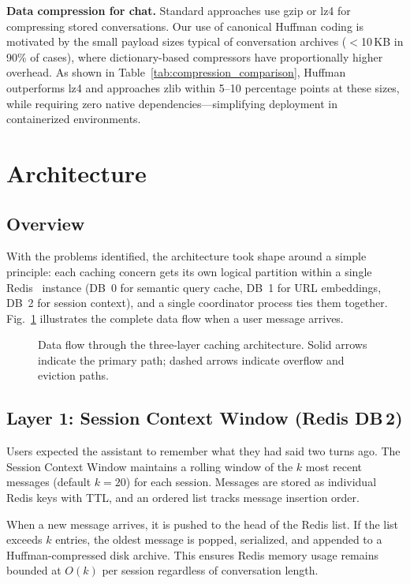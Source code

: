 \documentclass[conference]{IEEEtran}
\begin{document}
\textbf{Data compression for chat.}
Standard approaches use gzip or lz4 for compressing stored conversations. Our use of canonical Huffman coding is motivated by the small payload sizes typical of conversation archives ($<$10\,KB in 90\% of cases), where dictionary-based compressors have proportionally higher overhead. As shown in Table~\ref{tab:compression_comparison}, Huffman outperforms lz4 and approaches zlib within 5--10 percentage points at these sizes, while requiring zero native dependencies---simplifying deployment in containerized environments.

\section{Architecture}
\label{sec:architecture}

\subsection{Overview}

With the problems identified, the architecture took shape around a simple 
principle: each caching concern gets its own logical partition within a single Redis~\cite{redis2023} instance (DB~0 for semantic query cache, DB~1 for URL embeddings, DB~2 for session context), and a single coordinator process ties them together. Fig.~\ref{fig:architecture} illustrates 
the complete data flow when a user message arrives.

\begin{figure}[t]
\centering

\caption{Data flow through the three-layer caching architecture. Solid arrows indicate the primary path; dashed arrows indicate overflow and eviction paths.}
\label{fig:architecture}
\end{figure}

\subsection{Layer 1: Session Context Window (Redis DB\,2)}

Users expected the assistant to remember what they had said two turns ago. The Session Context Window maintains a rolling window of the $k$ most recent messages (default $k{=}20$) for each session. Messages are stored as individual Redis keys with TTL, and an ordered list tracks message insertion order.

When a new message arrives, it is pushed to the head of the Redis list. If the list exceeds $k$ entries, the oldest message is popped, serialized, and appended to a Huffman-compressed disk archive. This ensures Redis memory usage remains bounded at $O(k)$ per session regardless of conversation length.
\end{document}
